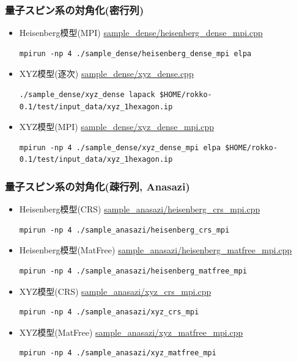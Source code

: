 \begin{frame}[c,fragile]
  \frametitle{量子スピン系の対角化(密行列)}
  \begin{itemize}
  \item Heisenberg模型(MPI) \href{https://github.com/t-sakashita/rokko/blob/master/sample_dense/heisenberg_dense_mpi.cpp}{sample\_dense/heisenberg\_dense\_mpi.cpp}
\begin{lstlisting}
mpirun -np 4 ./sample_dense/heisenberg_dense_mpi elpa
\end{lstlisting}
  \item XYZ模型(逐次) \href{https://github.com/t-sakashita/rokko/blob/master/sample_dense/xyz_dense.cpp}{sample\_dense/xyz\_dense.cpp}
\begin{lstlisting}
./sample_dense/xyz_dense lapack $HOME/rokko-0.1/test/input_data/xyz_1hexagon.ip
\end{lstlisting}
  \item XYZ模型(MPI) \href{https://github.com/t-sakashita/rokko/blob/master/sample_dense/xyz_dense_mpi.cpp}{sample\_dense/xyz\_dense\_mpi.cpp}
\begin{lstlisting}
mpirun -np 4 ./sample_dense/xyz_dense_mpi elpa $HOME/rokko-0.1/test/input_data/xyz_1hexagon.ip
\end{lstlisting}
  \end{itemize}
\end{frame}

\begin{frame}[c,fragile]
  \frametitle{量子スピン系の対角化(疎行列, Anasazi)}
  \begin{itemize}
  \item Heisenberg模型(CRS) \href{https://github.com/t-sakashita/rokko/blob/master/sample_anasazi/heisenberg_crs_mpi.cpp}{sample\_anasazi/heisenberg\_crs\_mpi.cpp}
\begin{lstlisting}
mpirun -np 4 ./sample_anasazi/heisenberg_crs_mpi
\end{lstlisting}
  \item Heisenberg模型(MatFree) \href{https://github.com/t-sakashita/rokko/blob/master/sample_anasazi/heisenberg_matfree_mpi.cpp}{sample\_anasazi/heisenberg\_matfree\_mpi.cpp}
\begin{lstlisting}
mpirun -np 4 ./sample_anasazi/heisenberg_matfree_mpi
\end{lstlisting}
  \item XYZ模型(CRS) \href{https://github.com/t-sakashita/rokko/blob/master/sample_anasazi/xyz_crs_mpi.cpp}{sample\_anasazi/xyz\_crs\_mpi.cpp}
\begin{lstlisting}
mpirun -np 4 ./sample_anasazi/xyz_crs_mpi
\end{lstlisting}
  \item XYZ模型(MatFree) \href{https://github.com/t-sakashita/rokko/blob/master/sample_anasazi/xyz_matfree_mpi.cpp}{sample\_anasazi/xyz\_matfree\_mpi.cpp}
\begin{lstlisting}
mpirun -np 4 ./sample_anasazi/xyz_matfree_mpi
\end{lstlisting}
  \end{itemize}
\end{frame}



